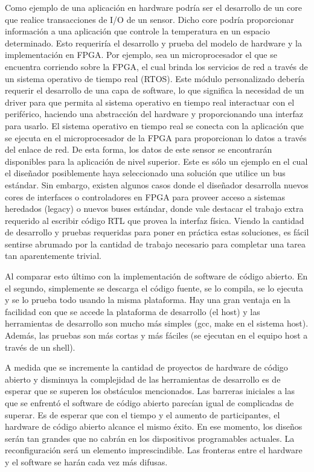Como ejemplo de una aplicación en hardware podría ser el desarrollo de
un core que realice transacciones de I/O de un sensor. Dicho core
podría proporcionar información a una aplicación que controle la
temperatura en un espacio determinado. Esto requeriría el desarrollo y
prueba del modelo de hardware y la implementación en FPGA. Por
ejemplo, sea un microprocesador el que se encuentra corriendo sobre la
FPGA, el cual brinda los servicios de red a través de un sistema
operativo de tiempo real (RTOS). Este módulo personalizado debería
requerir el desarrollo de una capa de software, lo que significa la
necesidad de un driver para que permita al sistema operativo en tiempo
real interactuar con el periférico, haciendo una abstracción del
hardware y proporcionando una interfaz para usarlo. El sistema
operativo en tiempo real se conecta con la aplicación que se ejecuta
en el microprocesador de la FPGA para proporcionan lo datos a través
del enlace de red. De esta forma, los datos de este sensor se
encontrarán disponibles para la aplicación de nivel superior. Este es
sólo un ejemplo en el cual el diseñador posiblemente haya seleccionado
una solución que utilice un bus estándar. Sin embargo, existen algunos
casos donde el diseñador desarrolla nuevos cores de interfaces o
controladores en FPGA para proveer acceso a sistemas heredados
(legacy) o nuevos buses estándar, donde vale destacar el trabajo extra
requerido al escribir código RTL que provea la interfaz física. Viendo
la cantidad de desarrollo y pruebas requeridas para poner en práctica
estas soluciones, es fácil sentirse abrumado por la cantidad de
trabajo necesario para completar una tarea tan aparentemente trivial.

Al comparar esto último con la implementación de software de código
abierto. En el segundo, simplemente se descarga el código fuente, se
lo compila, se lo ejecuta y se lo prueba todo usando la misma
plataforma. Hay una gran ventaja en la facilidad con que se accede la
plataforma de desarrollo (el host) y las herramientas de
desarrollo son mucho más simples (gcc, make en el sistema
host). Además, las pruebas son más cortas y más fáciles (se
ejecutan en el equipo host a través de un shell).


A medida que se incremente la cantidad de proyectos de hardware de código
abierto y disminuya la complejidad de las herramientas de desarrollo
es de esperar que se superen los obstáculos mencionados. Las barreras
iniciales a las que se enfrentó el software de código abierto parecían
igual de complicadas de superar. Es de esperar que con el tiempo y el
aumento de participantes, el hardware de código abierto alcance el
mismo éxito. En ese momento, los diseños serán tan grandes que no
cabrán en los dispositivos programables actuales. La reconfiguración
será un elemento imprescindible. Las fronteras entre el hardware y el
software se harán cada vez más difusas.




